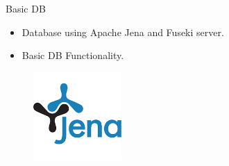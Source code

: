 \begin{frame}{Basic DB}
	\begin{itemize}
		\item Database using Apache Jena and Fuseki server.
		\item Basic DB Functionality.
		
	\end{itemize}
	\begin{figure}[htbp]
  		\centering
  		\includegraphics[width=0.3\textwidth]{figures/jena}
	\end{figure}
\end{frame}